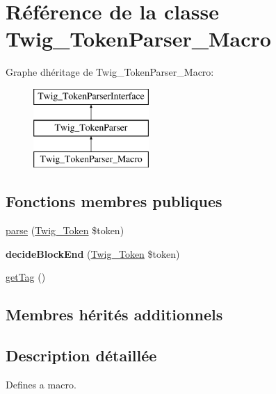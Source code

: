 \hypertarget{class_twig___token_parser___macro}{}\section{Référence de la classe Twig\+\_\+\+Token\+Parser\+\_\+\+Macro}
\label{class_twig___token_parser___macro}
Graphe d\textquotesingle{}héritage de Twig\+\_\+\+Token\+Parser\+\_\+\+Macro\+:\begin{figure}[H]
\begin{center}
\leavevmode
\includegraphics[height=3.000000cm]{class_twig___token_parser___macro}
\end{center}
\end{figure}
\subsection*{Fonctions membres publiques}
\begin{DoxyCompactItemize}
\item 
\hyperlink{class_twig___token_parser___macro_a5dfa2e269321584fb74e8b43dabe0efd}{parse} (\hyperlink{class_twig___token}{Twig\+\_\+\+Token} \$token)
\item 
{\bfseries decide\+Block\+End} (\hyperlink{class_twig___token}{Twig\+\_\+\+Token} \$token)\hypertarget{class_twig___token_parser___macro_aa976dc013d35c2813752149bacd88902}{}\label{class_twig___token_parser___macro_aa976dc013d35c2813752149bacd88902}

\item 
\hyperlink{class_twig___token_parser___macro_ab86ba36154b20e6bbfa3ba705f12f9d6}{get\+Tag} ()
\end{DoxyCompactItemize}
\subsection*{Membres hérités additionnels}


\subsection{Description détaillée}
Defines a macro.


